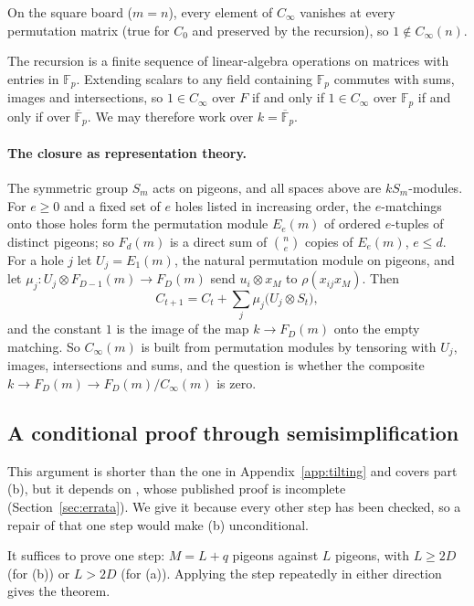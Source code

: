 On the square board ($m=n$), every element of $C_\infty$ vanishes at every permutation
matrix (true for $C_0$ and preserved by the recursion), so $1\notin C_\infty(n)$.

The recursion is a finite sequence of linear-algebra operations on matrices with entries in
$\mathbb F_p$.  Extending scalars to any field containing $\mathbb F_p$ commutes with sums,
images and intersections, so $1\in C_\infty$ over $F$ if and only if $1\in C_\infty$ over
$\mathbb F_p$ if and only if over $\overline{\mathbb F}_p$.  We may therefore work over
$k=\overline{\mathbb F}_p$.

\paragraph{The closure as representation theory.}  The symmetric group $S_m$ acts on
pigeons, and all spaces above are $kS_m$-modules.  For $e\ge0$ and a fixed set of $e$ holes
listed in increasing order, the $e$-matchings onto those holes form the permutation module
$E_e(m)$ of ordered $e$-tuples of distinct pigeons; so $F_d(m)$ is a direct sum of
$\binom ne$ copies of $E_e(m)$, $e\le d$.  For a hole $j$ let $U_j=E_1(m)$, the natural
permutation module on pigeons, and let $\mu_j\colon U_j\otimes F_{D-1}(m)\to F_D(m)$ send
$u_i\otimes x_M$ to $\rho(x_{ij}x_M)$.  Then
\[
  C_{t+1}=C_t+\textstyle\sum_{j}\mu_j\bigl(U_j\otimes S_t\bigr),
\]
and the constant $1$ is the image of the map $k\to F_D(m)$ onto the empty matching.  So
$C_\infty(m)$ is built from permutation modules by tensoring with $U_j$, images,
intersections and sums, and the question is whether the composite
$k\to F_D(m)\to F_D(m)/C_\infty(m)$ is zero.

\subsection{A conditional proof through semisimplification}\label{sec:periodicity-oti}

This argument is shorter than the one in Appendix~\ref{app:tilting} and covers part (b), but
it depends on \cite[Thm.~8.4.5]{hone2025}, whose published proof is incomplete
(Section~\ref{sec:errata}).  We give it because every other step has been checked, so a
repair of that one step would make (b) unconditional.

It suffices to prove one step: $M=L+q$ pigeons against $L$ pigeons, with $L\ge2D$ (for (b))
or $L>2D$ (for (a)).  Applying the step repeatedly in either direction gives the theorem.

